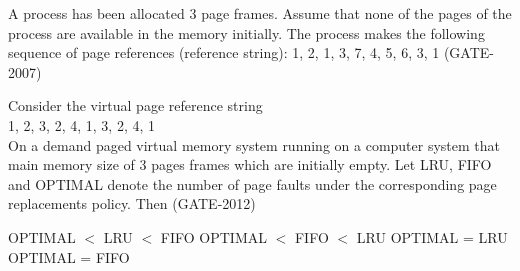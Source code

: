 
\begin{questyle}

  \question  A process has been allocated 3 page frames. Assume that none of the pages of the process are
            available in the memory initially. The process makes the following sequence of
            page references (reference string): 1, 2, 1, 3, 7, 4, 5, 6, 3, 1 (GATE-2007)


\end{questyle}


\begin{questyle}

  \question  Consider the virtual page reference string \\ 1, 2, 3, 2, 4, 1, 3, 2, 4, 1 \\
             On a demand paged virtual memory system running on a computer system that main memory size of 3 pages
             frames which are initially empty. Let LRU, FIFO and OPTIMAL denote the number of page faults under
             the corresponding page replacements policy. Then (GATE-2012)

  \begin{choices}
    \choice OPTIMAL \(<\) LRU \(<\) FIFO
    \correctchoice OPTIMAL \(<\) FIFO \(<\) LRU
    \choice OPTIMAL = LRU
    \choice OPTIMAL = FIFO
  \end{choices}

\end{questyle}


